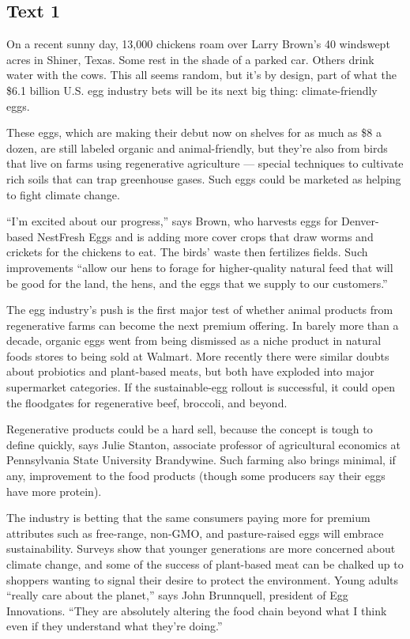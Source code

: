 \documentclass[UTF8,11pt]{ctexart}
\begin{document}
\subsection*{\textbf{Text 1}}


On a recent sunny day, 13,000 chickens roam over Larry Brown’s 40 windswept acres in Shiner, Texas. Some rest in the shade of a parked car. Others drink water with the cows. This all seems random, but it’s by design, part of what the \$6.1 billion U.S. egg industry bets will be its next big thing: climate-friendly eggs.


These eggs, which are making their debut now on shelves for as much as \$8 a dozen, are still labeled organic and animal-friendly, but they’re also from birds that live on farms using regenerative agriculture — special techniques to cultivate rich soils that can trap greenhouse gases. Such eggs could be marketed as helping to fight climate change.


“I’m excited about our progress,” says Brown, who harvests eggs for Denver-based NestFresh Eggs and is adding more cover crops that draw worms and crickets for the chickens to eat. The birds’ waste then fertilizes fields. Such improvements “allow our hens to forage for higher-quality natural feed that will be good for the land, the hens, and the eggs that we supply to our customers.”


The egg industry’s push is the first major test of whether animal products from regenerative farms can become the next premium offering. In barely more than a decade, organic eggs went from being dismissed as a niche product in natural foods stores to being sold at Walmart. More recently there were similar doubts about probiotics and plant-based meats, but both have exploded into major supermarket categories. If the sustainable-egg rollout is successful, it could open the floodgates for regenerative beef, broccoli, and beyond.


Regenerative products could be a hard sell, because the concept is tough to define quickly, says Julie Stanton, associate professor of agricultural economics at Pennsylvania State University Brandywine. Such farming also brings minimal, if any, improvement to the food products (though some producers say their eggs have more protein).


The industry is betting that the same consumers paying more for premium attributes such as free-range, non-GMO, and pasture-raised eggs will embrace sustainability. Surveys show that younger generations are more concerned about climate change, and some of the success of plant-based meat can be chalked up to shoppers wanting to signal their desire to protect the environment. Young adults “really care about the planet,” says John Brunnquell, president of Egg Innovations. “They are absolutely altering the food chain beyond what I think even if they understand what they’re doing.”
\end{document}
